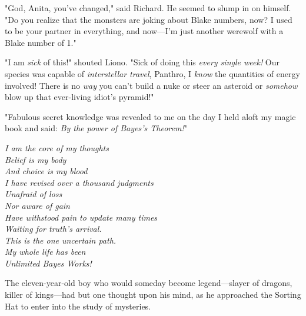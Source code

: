 "God, Anita, you've changed," said Richard. He seemed to slump in on himself.
"Do you realize that the monsters are joking about Blake numbers, now? I used
to be your partner in everything, and now---I'm just another werewolf with a
Blake number of 1."
\sbreak

\noindent{}"I am \emph{sick} of this!" shouted Liono. "Sick of doing this \emph{every
single week!} Our species was capable of \emph{interstellar travel}, Panthro, I
\emph{know} the quantities of energy involved! There is no \emph{way} you can't
build a nuke or steer an asteroid or \emph{somehow} blow up that ever-living
idiot's pyramid!"
\sbreak
{}

\noindent{} "Fabulous secret knowledge was revealed to me on the day I held aloft my magic
book and said: \emph{By the power of Bayes's Theorem!}"
\sbreak
{}

\begin{center}
    \itshape
    I am the core of my thoughts\\
    Belief is my body\\
    And choice is my blood\\
    I have revised over a thousand judgments\\
    Unafraid of loss\\
    Nor aware of gain\\
    Have withstood pain to update many times\\
    Waiting for truth's arrival.\\
    This is the one uncertain path.\\
    My whole life has been\el\\
    Unlimited Bayes Works!
\end{center}
\sbreak
{}

\noindent{}The eleven-year-old boy who would someday become legend---slayer of dragons,
killer of kings---had but one thought upon his mind, as he approached the
Sorting Hat to enter into the study of mysteries.

